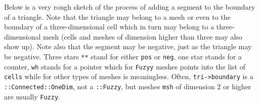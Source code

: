 Below is a very rough sketch of the process of adding a segment to the boundary of a triangle.
Note that the triangle may belong to a mesh or even to the boundary of a three-dimensional
cell which in turn may belong to a three-dimensional mesh
(cells and meshes of dimension higher than three may also show up).
Note also that the segment may be negative, just as the triangle may be negative.
Three stars {\small\tt ***} stand for either {\small\tt pos} or {\small\tt neg},
one star {\small\tt *} stands for a counter,
{\small\tt wh} stands for a pointer which for {\small\tt Fuzyy} meshes points into the
list of {\small\tt cells} while for other types of meshes is meaningless.
Often, {\small\tt tri->boundary} is a {\small\tt{}::Connected::OneDim},
not a {\small\tt{}::Fuzzy}, but meshes {\small\tt msh} of dimension 2 or higher
are usually {\small\tt Fuzzy}.

